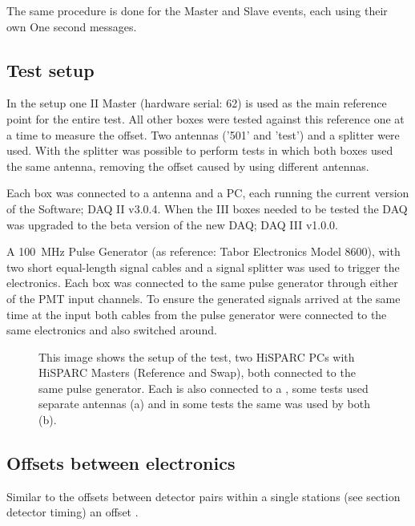The same procedure is done for the Master and Slave events, each using their own One second messages.


\subsection{Test setup}
\label{sub:gps_test_setup}

In the setup one \hisparc II Master (hardware serial: 62) is used as the main reference point for the entire test. All other \hisparc boxes were tested against this reference one at a time to measure the offset. Two \gps antennas ('501' and 'test') and a \gps splitter were used. With the splitter was possible to perform tests in which both \hisparc boxes used the same \gps antenna, removing the offset caused by using different \gps antennas.

Each \hisparc box was connected to a \gps antenna and a PC, each running the current version of the \hisparc Software; \hisparc DAQ II v3.0.4. When the \hisparc III boxes needed to be tested the DAQ was upgraded to the beta version of the new DAQ; \hisparc DAQ III v1.0.0.

A \SI{100}{\mega\hertz} Pulse Generator (as reference: Tabor Electronics Model 8600), with two short equal-length signal cables and a signal splitter was used to trigger the \hisparc electronics. Each box was connected to the same pulse generator through either of the PMT input channels. To ensure the generated signals arrived at the same time at the input both cables from the pulse generator were connected to the same \hisparc electronics and also switched around.

\begin{figure}
    \centering
    
    \caption{This image shows the setup of the test, two HiSPARC PCs
             with HiSPARC Masters (Reference and Swap), both connected
             to the same pulse generator. Each is also connected to a
             \gps, some tests used separate \gps antennas (a) and in
             some tests the same \gps was used by both (b).}
    \label{fig:setup}
\end{figure}


\subsection{Offsets between \hisparc electronics}
\label{sub:gps_offsets}

Similar to the offsets between detector pairs within a single stations (see section detector timing) an offset .

